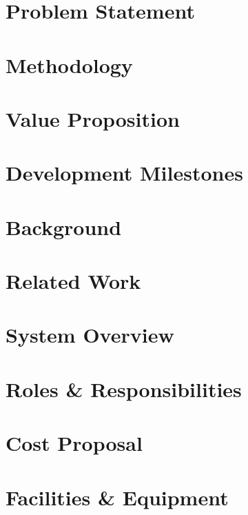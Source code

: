 \documentclass[11pt,letterpaper]{article}
\begin{document}
\section{Problem Statement}

\section{Methodology}

\section{Value Proposition}

\section{Development Milestones}

\newpage

\section{Background}

\section{Related Work}

\section{System Overview}

\section{Roles \& Responsibilities}

\section{Cost Proposal}

\section{Facilities \& Equipment}

\end{document}
